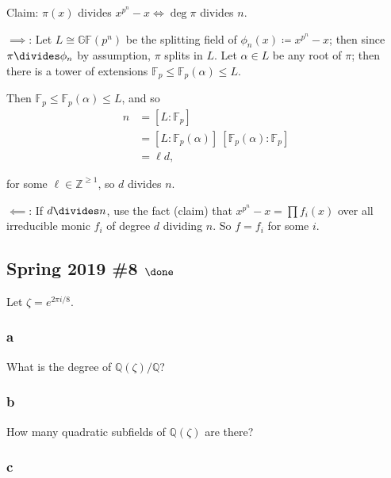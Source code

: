 \begin{solution}
Claim: \(\pi(x)\) divides \(x^{p^n}-x \iff \deg \pi\) divides \(n\).

\(\implies\): Let \(L \cong {\mathbb{GF}}(p^n)\) be the splitting field
of \(\phi_n(x) \coloneqq x^{p^n}-x\); then since \(\pi \divides \phi_n\)
by assumption, \(\pi\) splits in \(L\). Let \(\alpha \in L\) be any root
of \(\pi\); then there is a tower of extensions
\({\mathbb{F}}_p \leq {\mathbb{F}}_p(\alpha) \leq L\).

Then \({\mathbb{F}}_p \leq {\mathbb{F}}_p(\alpha) \leq L\), and so
\begin{align*}
n &= [L: {\mathbb{F}}_p] \\
&= [L: {\mathbb{F}}_p(\alpha)]~[{\mathbb{F}}_p(\alpha): {\mathbb{F}}_p] \\
&= \ell d
,\end{align*}

for some \(\ell \in {\mathbb{Z}}^{\geq 1}\), so \(d\) divides \(n\).

\(\impliedby\): If \(d\divides n\), use the fact (claim) that
\(x^{p^n} - x = \prod f_i(x)\) over all irreducible monic \(f_i\) of
degree \(d\) dividing \(n\). So \(f = f_i\) for some \(i\).

\end{solution}

\hypertarget{spring-2019-8-done}{%
\subsection{\texorpdfstring{Spring 2019 \#8
\(\done\)}{Spring 2019 \#8 \textbackslash done}}\label{spring-2019-8-done}}

Let \(\zeta = e^{2\pi i/8}\).

\hypertarget{a-55}{%
\subsubsection{a}\label{a-55}}

What is the degree of \({\mathbb{Q}}(\zeta)/{\mathbb{Q}}\)?

\hypertarget{b-45}{%
\subsubsection{b}\label{b-45}}

How many quadratic subfields of \({\mathbb{Q}}(\zeta)\) are there?

\hypertarget{c-29}{%
\subsubsection{c}\label{c-29}}

